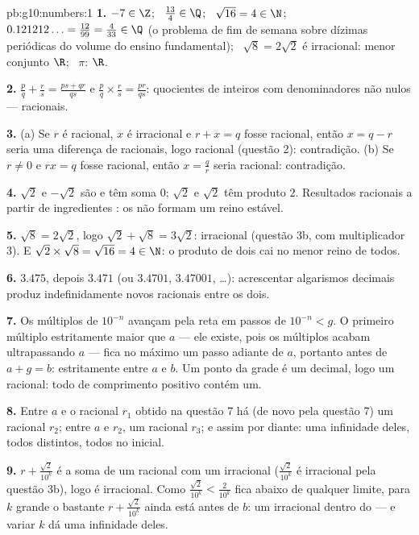 \begin{solution}{pb:g10:numbers:1}
\textbf{1.} $-7 \in \Z$; \ $\frac{13}{4} \in \Q$; \
$\sqrt{16} = 4 \in \N$; \ $0.121212\ldots = \frac{12}{99} =
\frac{4}{33} \in \Q$ (o problema de fim de semana sobre dízimas
periódicas do volume do ensino fundamental); \
$\sqrt8 = 2\sqrt2$ é irracional: menor conjunto $\R$; \ $\pi$:
$\R$.

\textbf{2.} $\frac pq + \frac rs = \frac{ps + qr}{qs}$ e
$\frac pq \times \frac rs = \frac{pr}{qs}$: quocientes de
inteiros com denominadores não nulos --- racionais.

\textbf{3.} (a) Se $r$ é racional, $x$ é irracional e
$r + x = q$ fosse racional, então $x = q - r$ seria uma
diferença de racionais, logo racional (questão 2):
contradição. (b) Se $r \neq 0$ e $r x = q$ fosse racional,
então $x = \frac qr$ seria racional: contradição.

\textbf{4.} $\sqrt2$ e $-\sqrt2$ são  e têm soma $0$;
$\sqrt2$ e $\sqrt2$ têm produto $2$. Resultados racionais a
partir de ingredientes : os \omterm{ex:g10:numbers:classify}{irracionais} não formam
um reino estável.

\textbf{5.} $\sqrt8 = 2\sqrt2$, logo
$\sqrt2 + \sqrt8 = 3\sqrt2$: irracional (questão 3b, com
multiplicador $3$). E $\sqrt2 \times \sqrt8 = \sqrt{16} = 4 \in
\N$: o produto de dois  cai no menor reino de
todos.

\textbf{6.} $3.475$, depois $3.471$ (ou $3.4701$, $3.47001$,
\dots): acrescentar algarismos decimais produz indefinidamente
novos racionais entre os dois.

\textbf{7.} Os múltiplos de $10^{-n}$ avançam pela reta em
passos de $10^{-n} < g$. O primeiro múltiplo estritamente maior
que $a$ --- ele existe, pois os múltiplos acabam ultrapassando
$a$ --- fica no máximo um passo adiante de $a$, portanto antes
de $a + g = b$: estritamente entre $a$ e $b$. Um ponto da grade
é um decimal, logo um racional: todo  de comprimento
positivo contém um.

\textbf{8.} Entre $a$ e o racional $r_1$ obtido na questão 7 há
(de novo pela questão 7) um racional $r_2$; entre $a$ e $r_2$,
um racional $r_3$; e assim por diante: uma infinidade deles,
todos distintos, todos no  inicial.

\textbf{9.} $r + \frac{\sqrt2}{10^k}$ é a soma de um racional
com um irracional ($\frac{\sqrt2}{10^k}$ é irracional pela
questão 3b), logo é irracional. Como
$\frac{\sqrt2}{10^k} < \frac{2}{10^k}$ fica abaixo de qualquer
limite, para $k$ grande o bastante $r + \frac{\sqrt2}{10^k}$
ainda está antes de $b$: um irracional dentro do  ---
e variar $k$ dá uma infinidade deles.


\end{solution}
